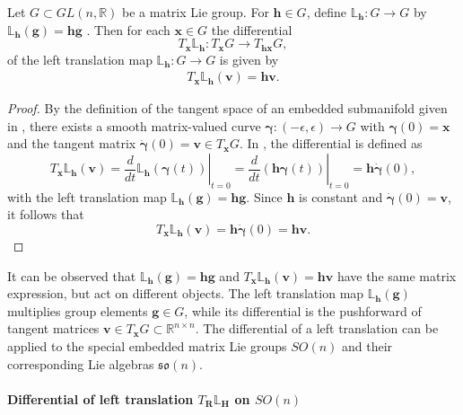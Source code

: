 \begin{proposition}
Let $G\subset GL(n,\mathbb{R})$ be a matrix Lie group.
For $\bm{h}\in G$, define $\mathbb{L}_{\bm{h}}:G\to G$ by $\mathbb{L}_{\bm{h}}(\bm{g})=\bm{h}\bm{g}$ \cite{Hall2000LieGroups}.
Then for each $\bm{x}\in G$ the differential
\[
T_{\bm{x}}\mathbb{L}_{\bm{h}}: T_{\bm{x}}G \to T_{\bm{h}\bm{x}}G,
\]
of the left translation map $\mathbb{L}_{\bm{h}}:G\to G$ is given by
\begin{align}\label{eq:preliminaries_differential_left_translation}
T_{\bm{x}}\mathbb{L}_{\bm{h}}(\bm{v})=\bm{h}\bm{v}.
\end{align}
\end{proposition}
\begin{proof}
By the definition of the tangent space of an embedded submanifold given in \cite{Hall2000LieGroups}, there exists a smooth matrix-valued curve $\bm{\gamma}: (-\epsilon,\epsilon) \to G$ with $\bm{\gamma}(0)=\bm{x}$ and the tangent matrix $\dot{\bm{\gamma}}(0)=\bm{v} \in T_{\bm{x}}G$.
In \cite{Lee2008}, the differential is defined as
\[
T_{\bm{x}}\mathbb{L}_{\bm{h}}(\bm{v})=\left.\frac{d}{dt}\mathbb{L}_{\bm{h}}(\bm{\gamma}(t))\right|_{t=0}
=\left.\frac{d}{dt}(\bm{h}\bm{\gamma}(t))\right|_{t=0}=\bm{h}\dot{\bm{\gamma}}(0),
\]
with the left translation map $\mathbb{L}_{\bm{h}}(\bm{g})=\bm{h}\bm{g}$. Since $\bm{h}$ is constant and $\dot{\bm{\gamma}}(0)=\bm{v}$, it follows that
\[
T_{\bm{x}}\mathbb{L}_{\bm{h}}(\bm{v})=\bm{h}\dot{\bm{\gamma}}(0)=\bm{h}\bm{v}.
\]
\end{proof}

It can be observed that $\mathbb{L}_{\bm{h}}(\bm{g})=\bm{h}\bm{g}$ and $T_{\bm{x}}\mathbb{L}_{\bm{h}}(\bm{v})=\bm{h}\bm{v}$ have the same matrix expression, but act on different objects. The left translation map $\mathbb{L}_{\bm{h}}(\bm{g})$ multiplies group elements $\bm{g} \in G$, while its differential is the pushforward of tangent matrices $\bm{v} \in T_{\bm{x}}G \subset \mathbb{R}^{n \times n}$. The differential of a left translation can be applied to the special embedded matrix Lie groups $SO(n)$ and their corresponding Lie algebras $\mathfrak{so}(n)$. 

\paragraph{Differential of left translation $T_{\bm{R}}\mathbb{L}_{\bm{H}}$ on $SO(n)$}

